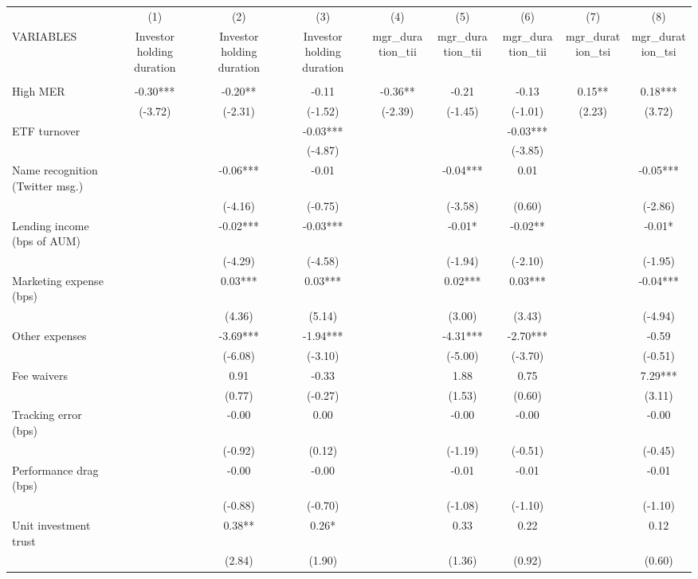\documentclass[]{article}
\begin{document}
\begin{tabular}{lcccccccc} \hline
 & (1) & (2) & (3) & (4) & (5) & (6) & (7) & (8) \\
VARIABLES & Investor holding duration & Investor holding duration & Investor holding duration & mgr\_duration\_tii & mgr\_duration\_tii & mgr\_duration\_tii & mgr\_duration\_tsi & mgr\_duration\_tsi \\ \hline
 &  &  &  &  &  &  &  &  \\
High MER & -0.30*** & -0.20** & -0.11 & -0.36** & -0.21 & -0.13 & 0.15** & 0.18*** \\
 & (-3.72) & (-2.31) & (-1.52) & (-2.39) & (-1.45) & (-1.01) & (2.23) & (3.72) \\
ETF turnover &  &  & -0.03*** &  &  & -0.03*** &  &  \\
 &  &  & (-4.87) &  &  & (-3.85) &  &  \\
Name recognition (Twitter msg.) &  & -0.06*** & -0.01 &  & -0.04*** & 0.01 &  & -0.05*** \\
 &  & (-4.16) & (-0.75) &  & (-3.58) & (0.60) &  & (-2.86) \\
Lending income (bps of AUM) &  & -0.02*** & -0.03*** &  & -0.01* & -0.02** &  & -0.01* \\
 &  & (-4.29) & (-4.58) &  & (-1.94) & (-2.10) &  & (-1.95) \\
Marketing expense (bps) &  & 0.03*** & 0.03*** &  & 0.02*** & 0.03*** &  & -0.04*** \\
 &  & (4.36) & (5.14) &  & (3.00) & (3.43) &  & (-4.94) \\
Other expenses &  & -3.69*** & -1.94*** &  & -4.31*** & -2.70*** &  & -0.59 \\
 &  & (-6.08) & (-3.10) &  & (-5.00) & (-3.70) &  & (-0.51) \\
Fee waivers &  & 0.91 & -0.33 &  & 1.88 & 0.75 &  & 7.29*** \\
 &  & (0.77) & (-0.27) &  & (1.53) & (0.60) &  & (3.11) \\
Tracking error (bps) &  & -0.00 & 0.00 &  & -0.00 & -0.00 &  & -0.00 \\
 &  & (-0.92) & (0.12) &  & (-1.19) & (-0.51) &  & (-0.45) \\
Performance drag (bps) &  & -0.00 & -0.00 &  & -0.01 & -0.01 &  & -0.01 \\
 &  & (-0.88) & (-0.70) &  & (-1.08) & (-1.10) &  & (-1.10) \\
Unit investment trust &  & 0.38** & 0.26* &  & 0.33 & 0.22 &  & 0.12 \\
 &  & (2.84) & (1.90) &  & (1.36) & (0.92) &  & (0.60) \\

\end{tabular}
\end{document}
